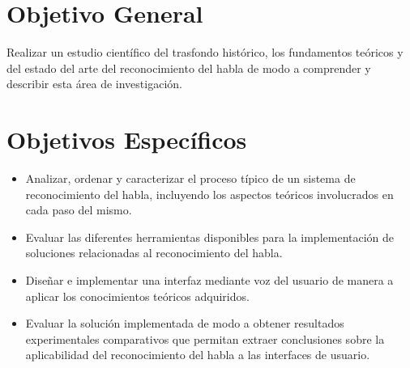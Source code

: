 \section{Objetivo General}
\label{sec:objgral}

Realizar un estudio cient\'{i}fico del trasfondo hist\'{o}rico, los fundamentos te\'{o}ricos 
y del estado del arte del reconocimiento del habla de modo a comprender y describir 
esta \'{a}rea de investigaci\'{o}n.  


\section{Objetivos Espec\'{i}ficos}
\label{sec:objspec}

\begin{itemize}
    \item Analizar, ordenar y caracterizar el proceso t\'{i}pico de un sistema de reconocimiento del habla, 
        incluyendo los aspectos te\'{o}ricos involucrados en cada paso del mismo.

    \item Evaluar las diferentes herramientas disponibles para la implementaci\'{o}n de soluciones 
        relacionadas al reconocimiento del habla.
    
    \item Dise\~{n}ar e implementar una interfaz mediante voz del usuario de manera a aplicar los 
        conocimientos te\'{o}ricos adquiridos.
    
    \item Evaluar la soluci\'{o}n implementada de modo a obtener resultados experimentales comparativos que 
        permitan extraer conclusiones sobre la aplicabilidad del reconocimiento del habla a las interfaces 
        de usuario.
\end{itemize}

